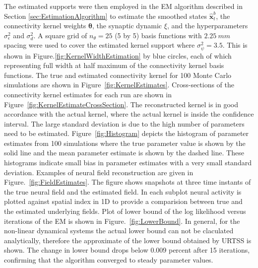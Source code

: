 \documentclass[]{article}
\begin{document}
The estimated supports were then employed in the EM algorithm described in Section \ref{sec:EstimationAlgorithm} to estimate the smoothed states $\hat{\mathbf x}_t^b$, the connectivity kernel weights $\boldsymbol\theta$, the synaptic dynamic $\xi$, and the hyperparameters $\sigma_{\epsilon}^2$ and $\sigma^2_d$. A  square grid of $n_{\theta}=25$ (5 by 5) basis functions with $2.25~mm$ spacing were used to cover the estimated kernel support where $\sigma_{\psi}^2=3.5$. This is shown in Figure.\ref{fig:KernelWidthEstimation} by blue circles, each of which representing full width at half maximum of the connectivity kernel basis functions. The true and estimated connectivity kernel for 100 Monte Carlo simulations are shown in Figure~\ref{fig:KernelEstimates}. Cross-sections of the connectivity kernel estimates for each run are shown in Figure~\ref{fig:KernelEstimateCrossSection}. The reconstructed kernel is in good accordance with the actual kernel, where the actual kernel is inside the confidence interval. The large standard deviation is due to the high number of parameters need to be estimated. Figure~\ref{fig:Histogram} depicts the histogram of parameter estimates from 100 simulations where the true parameter value is shown by the solid line and the mean parameter estimate is shown by the dashed line. These histograms indicate small bias in parameter estimates with a very small standard deviation. Examples of neural field reconstruction are given in Figure.~\ref{fig:FieldEstimates}.  The figure shows snapshots at three time instants of the true neural field and the estimated field. In each subplot neural activity is plotted against spatial index in 1D to provide a comparision between true and the estimated underlying fields. Plot of lower bound of the log likelihood versus iterations of the EM is shown in Figure.~\ref{fig:LowerBound}. In general, for the non-linear dynamical systems the actual lower bound can not be claculated analytically, therefore the approximate of the lower bound obtained by URTSS is shown. The change in lower bound drops below 0.009 percent after 15 iterations, confirming
that the algorithm converged to steady parameter values.
\end{document}
